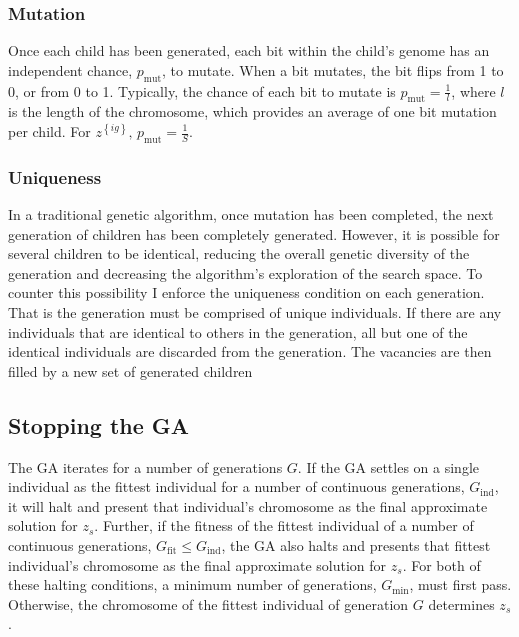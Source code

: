 \documentclass[12pt,dvipsnames]{report}
\begin{document}
\subsubsection{Mutation}

Once each child has been generated, each bit within the child's genome has an independent chance, $p_{\text{mut}}$, to mutate.  When a bit mutates, the bit flips from 1 to 0, or from 0 to 1.  Typically, the chance of each bit to mutate is $p_{\text{mut}} = \frac{1}{l}$, where $l$ is the length of the chromosome, which provides an average of one bit mutation per child.  For $z^{\left\{ ig \right\}},\, p_{\text{mut}} = \frac{1}{S}$.

\subsubsection{Uniqueness}

In a traditional genetic algorithm, once mutation has been completed, the next generation of children has been completely generated.  However, it is possible for several children to be identical, reducing the overall genetic diversity of the generation and decreasing the algorithm's exploration of the search space.  To counter this possibility I enforce the uniqueness condition on each generation.  That is the generation must be comprised of unique individuals.  If there are any individuals that are identical to others in the generation, all but one of the identical individuals are discarded from the generation.  The vacancies are then filled by a new set of generated children

\subsection{Stopping the GA} \label{subsec:ga_stop}

The GA iterates for a number of generations $G$.  If the GA settles on a single individual as the fittest individual for a number of continuous generations, $G_{\text{ind}}$, it will halt and present that individual's chromosome as the final approximate solution for $z_s$.  Further, if the fitness of the fittest individual of a number of continuous generations, $G_{\text{fit}} \leq G_{\text{ind}}$, the GA also halts and presents that fittest individual's chromosome as the final approximate solution for $z_s$.  For both of these halting conditions, a minimum number of generations, $G_{\min}$, must first pass.  Otherwise, the chromosome of the fittest individual of generation $G$ determines $z_s$.
\end{document}
